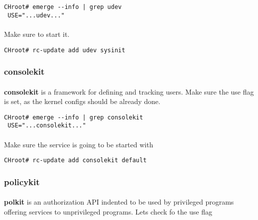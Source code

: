 \documentclass[11pt,a4paper]{article}
\begin{document}
                    \begin{lstlisting}[style=BashInputCHRoot]
 CHroot# emerge --info | grep udev
 USE="...udev..."
                    \end{lstlisting}

                    \paragraph{} Make sure to start it.

                    \begin{lstlisting}[style=BashInputCHRoot]
 CHroot# rc-update add udev sysinit
                    \end{lstlisting}

                \newpage
                \subsubsection{consolekit}

                    \paragraph{} \textbf{consolekit} is a framework for defining and tracking users. Make sure the use flag is set, as the kernel configs should be already done.

                    \begin{lstlisting}[style=BashInputCHRoot]
 CHroot# emerge --info | grep consolekit
 USE="...consolekit..."
                    \end{lstlisting}

                    \paragraph{} Make sure the service is going to be started with

                    \begin{lstlisting}[style=BashInputCHRoot]
 CHroot# rc-update add consolekit default
                    \end{lstlisting}

                \newpage
                \subsubsection{policykit}

                    \paragraph{} \textbf{polkit} is an authorization API indented to be used by privileged programs offering services to unprivileged programs. Lets check fo the use flag
\end{document}
